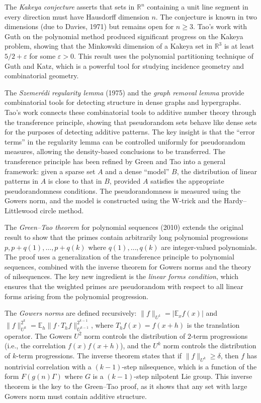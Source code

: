 The \emph{Kakeya conjecture} asserts that sets in $\mathbb{R}^n$ containing a unit line segment in every direction must have Hausdorff dimension $n$. The conjecture is known in two dimensions (due to Davies, 1971) but remains open for $n \ge 3$. Tao's work with Guth on the polynomial method produced significant progress on the Kakeya problem, showing that the Minkowski dimension of a Kakeya set in $\mathbb{R}^3$ is at least $5/2 + \varepsilon$ for some $\varepsilon > 0$. This result uses the polynomial partitioning technique of Guth and Katz, which is a powerful tool for studying incidence geometry and combinatorial geometry.

The \emph{Szemer\'edi regularity lemma} (1975) and the \emph{graph removal lemma} provide combinatorial tools for detecting structure in dense graphs and hypergraphs. Tao's work connects these combinatorial tools to additive number theory through the transference principle, showing that pseudorandom sets behave like dense sets for the purposes of detecting additive patterns. The key insight is that the ``error terms'' in the regularity lemma can be controlled uniformly for pseudorandom measures, allowing the density-based conclusions to be transferred. The transference principle has been refined by Green and Tao into a general framework: given a sparse set $A$ and a dense ``model'' $B$, the distribution of linear patterns in $A$ is close to that in $B$, provided $A$ satisfies the appropriate pseudorandomness conditions. The pseudorandomness is measured using the Gowers norm, and the model is constructed using the W-trick and the Hardy--Littlewood circle method.

The \emph{Green--Tao theorem \cite{greentao2008}} for polynomial sequences (2010) extends the original result to show that the primes contain arbitrarily long polynomial progressions $p, p+q(1), \ldots, p+q(k)$ where $q(1), \ldots, q(k)$ are integer-valued polynomials. The proof uses a generalization of the transference principle to polynomial sequences, combined with the inverse theorem for Gowers norms and the theory of nilsequences. The key new ingredient is the \emph{linear forms condition}, which ensures that the weighted primes are pseudorandom with respect to all linear forms arising from the polynomial progression.

The \emph{Gowers norms} are defined recursively: $\|f\|_{U^1} = |\mathbb{E}_x f(x)|$ and $\|f\|_{U^k}^{2^k} = \mathbb{E}_h \|f \cdot T_h f\|_{U^{k-1}}^{2^{k-1}}$, where $T_h f(x) = f(x+h)$ is the translation operator. The Gowers $U^2$ norm controls the distribution of 2-term progressions (i.e., the correlation $f(x) f(x+h)$), and the $U^k$ norm controls the distribution of $k$-term progressions. The inverse theorem states that if $\|f\|_{U^k} \ge \delta$, then $f$ has nontrivial correlation with a $(k-1)$-step nilsequence, which is a function of the form $F(g(n)\Gamma)$ where $G$ is a $(k-1)$-step nilpotent Lie group. This inverse theorem is the key to the Green--Tao proof, as it shows that any set with large Gowers norm must contain additive structure.

